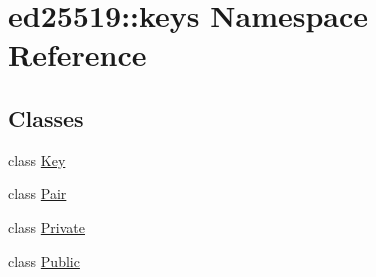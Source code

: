 \hypertarget{namespaceed25519_1_1keys}{}\section{ed25519\+:\+:keys Namespace Reference}
\label{namespaceed25519_1_1keys}
\subsection*{Classes}
\begin{DoxyCompactItemize}
\item 
class \mbox{\hyperlink{classed25519_1_1keys_1_1_key}{Key}}
\item 
class \mbox{\hyperlink{classed25519_1_1keys_1_1_pair}{Pair}}
\item 
class \mbox{\hyperlink{classed25519_1_1keys_1_1_private}{Private}}
\item 
class \mbox{\hyperlink{classed25519_1_1keys_1_1_public}{Public}}
\end{DoxyCompactItemize}
